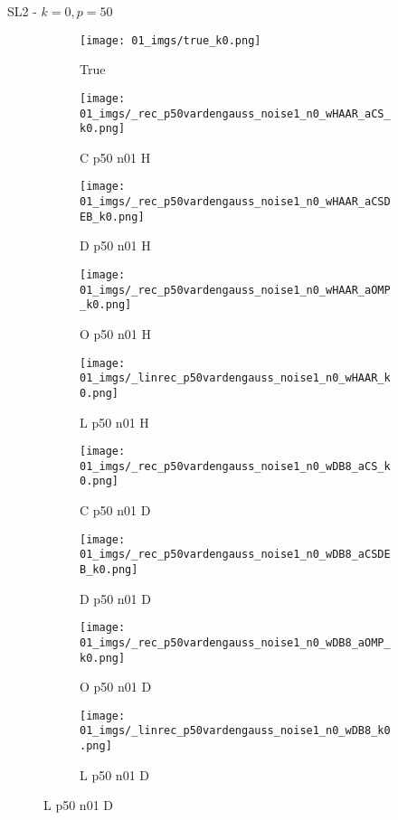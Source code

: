 \begin{frame}{SL2 - $k=0,p=50$}{}
\begin{figure}
\begin{subfigure}{0.1\textwidth}
\texttt{[image: 01\_imgs/true\_k0.png]}
\caption*{\Tiny True}
\end{subfigure}
\begin{subfigure}{0.1\textwidth}
\texttt{[image: 01\_imgs/\_rec\_p50vardengauss\_noise1\_n0\_wHAAR\_aCS\_k0.png]}
\caption*{\Tiny C p50 n01 H}
\end{subfigure}
\begin{subfigure}{0.1\textwidth}
\texttt{[image: 01\_imgs/\_rec\_p50vardengauss\_noise1\_n0\_wHAAR\_aCSDEB\_k0.png]}
\caption*{\Tiny D p50 n01 H}
\end{subfigure}
\begin{subfigure}{0.1\textwidth}
\texttt{[image: 01\_imgs/\_rec\_p50vardengauss\_noise1\_n0\_wHAAR\_aOMP\_k0.png]}
\caption*{\Tiny O p50 n01 H}
\end{subfigure}
\begin{subfigure}{0.1\textwidth}
\texttt{[image: 01\_imgs/\_linrec\_p50vardengauss\_noise1\_n0\_wHAAR\_k0.png]}
\caption*{\Tiny L p50 n01 H}
\end{subfigure}
\begin{subfigure}{0.1\textwidth}
\texttt{[image: 01\_imgs/\_rec\_p50vardengauss\_noise1\_n0\_wDB8\_aCS\_k0.png]}
\caption*{\Tiny C p50 n01 D}
\end{subfigure}
\begin{subfigure}{0.1\textwidth}
\texttt{[image: 01\_imgs/\_rec\_p50vardengauss\_noise1\_n0\_wDB8\_aCSDEB\_k0.png]}
\caption*{\Tiny D p50 n01 D}
\end{subfigure}
\begin{subfigure}{0.1\textwidth}
\texttt{[image: 01\_imgs/\_rec\_p50vardengauss\_noise1\_n0\_wDB8\_aOMP\_k0.png]}
\caption*{\Tiny O p50 n01 D}
\end{subfigure}
\begin{subfigure}{0.1\textwidth}
\texttt{[image: 01\_imgs/\_linrec\_p50vardengauss\_noise1\_n0\_wDB8\_k0.png]}
\caption*{\Tiny L p50 n01 D}
\end{subfigure}

\vspace{5pt}


\end{figure}
\end{frame}
